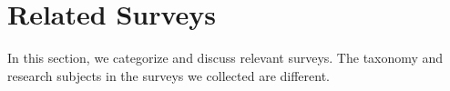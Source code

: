 \documentclass[a4paper,fleqn]{cas-dc}
\begin{document}

\section{Related Surveys}
In this section, we categorize and discuss relevant surveys.
The taxonomy and research subjects in the surveys we collected are different.
\end{document}
